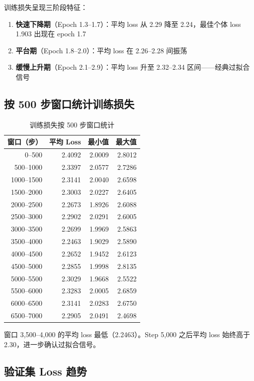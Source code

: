 \documentclass[12pt,a4paper]{ctexart}
\begin{document}
训练损失呈现三阶段特征：
\begin{enumerate}[nosep]
    \item \textbf{快速下降期}（Epoch 1.3--1.7）：平均 loss 从 2.29 降至 2.24，最佳个体 loss 1.903 出现在 epoch 1.7
    \item \textbf{平台期}（Epoch 1.8--2.0）：平均 loss 在 2.26--2.28 间振荡
    \item \textbf{缓慢上升期}（Epoch 2.1--2.9）：平均 loss 升至 2.32--2.34 区间——经典过拟合信号
\end{enumerate}

\subsection{按 500 步窗口统计训练损失}

\begin{table}[htbp]\centering
\caption{训练损失按 500 步窗口统计}
\begin{tabular}{@{}rrrr@{}}
\toprule
\textbf{窗口（步）} & \textbf{平均 Loss} & \textbf{最小值} & \textbf{最大值} \\
\midrule
0--500     & 2.4092 & 2.0009 & 2.8012 \\
500--1000  & 2.3397 & 2.0577 & 2.7286 \\
1000--1500 & 2.3141 & 2.0040 & 2.6598 \\
1500--2000 & 2.3003 & 2.0227 & 2.6405 \\
2000--2500 & 2.2673 & 1.8926 & 2.6088 \\
2500--3000 & 2.2902 & 2.0291 & 2.6005 \\
3000--3500 & 2.2699 & 1.9969 & 2.5863 \\
3500--4000 & 2.2463 & 1.9029 & 2.5890 \\
4000--4500 & 2.2652 & 1.9452 & 2.6123 \\
4500--5000 & 2.2855 & 1.9998 & 2.8135 \\
5000--5500 & 2.3029 & 1.9668 & 2.5522 \\
5500--6000 & 2.3283 & 2.0005 & 2.6859 \\
6000--6500 & 2.3141 & 2.0283 & 2.6750 \\
6500--7000 & 2.2905 & 2.0491 & 2.4698 \\
\bottomrule
\end{tabular}
\end{table}

窗口 3,500--4,000 的平均 loss 最低（2.2463）。Step 5,000 之后平均 loss 始终高于 2.30，进一步确认过拟合信号。

\subsection{验证集 Loss 趋势}
\end{document}
